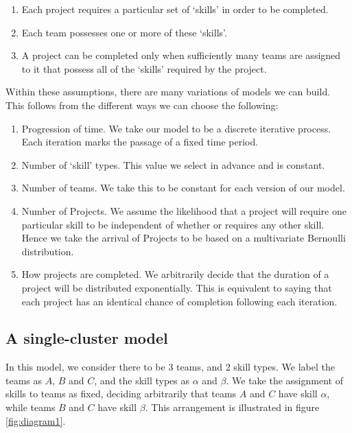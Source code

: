 \begin{enumerate}
	\item Each project requires a particular set of `skills' in order to be completed. 
	
	\item Each team possesses one or more of these `skills'. 
	
	\item A project can be completed only when sufficiently many teams are assigned to it that possess all of the `skills' required by the project.


\end{enumerate}

Within these assumptions, there are many variations of models we can build. This follows from the different ways we can choose the following:

\begin{enumerate}
	\item Progression of time. We take our model to be a discrete iterative process. Each iteration marks the passage of a fixed time period. 

	\item Number of `skill' types. This value we select in advance and is constant.
	\item Number of teams. We take this to be constant for each version of our model.

	\item Number of Projects. We assume the likelihood that a project will require one particular skill to be independent of whether or requires any other skill. Hence we take the arrival of Projects to be based on a multivariate Bernoulli distribution. 
	
	\item How projects are completed. We arbitrarily decide that the duration of a project will be distributed exponentially. This is equivalent to saying that each project has an identical chance of completion following each iteration.
	

\end{enumerate}


\subsection{A single-cluster model}
In this model, we consider there to be 3 teams, and 2 skill types. We label the teams as $A$, $B$ and $C$, and the skill types as $\alpha$ and $\beta$. We take the assignment of skills to teams as fixed, deciding arbitrarily that teams $A$ and $C$ have skill $\alpha$, while teams $B$ and $C$ have skill $\beta$. This arrangement is illustrated in figure \ref{fig:diagram1}.


